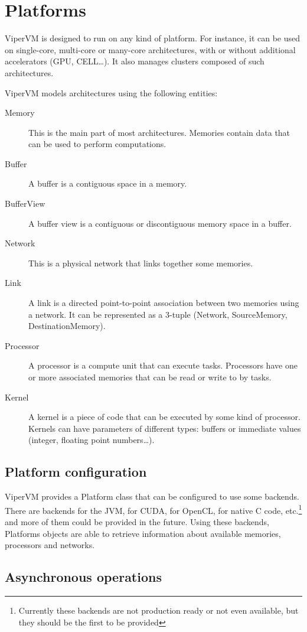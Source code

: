 \chapter{Platforms}

ViperVM is designed to run on any kind of platform. For instance, it can be
used on single-core, multi-core or many-core architectures, with or without
additional accelerators (GPU, CELL\ldots). It also manages clusters composed of
such architectures.

ViperVM models architectures using the following entities:

\begin{description}

  \item[Memory] This is the main part of most architectures. Memories contain
  data that can be used to perform computations.

  \item[Buffer] A buffer is a contiguous space in a memory.

  \item[BufferView] A buffer view is a contiguous or discontiguous memory space
  in a buffer.

  \item[Network] This is a physical network that links together some memories.

  \item[Link] A link is a directed point-to-point association between two
  memories using a network. It can be represented as a 3-tuple (Network,
  SourceMemory, DestinationMemory).

  \item[Processor] A processor is a compute unit that can execute tasks.
  Processors have one or more associated memories that can be read or write to
  by tasks.

  \item[Kernel] A kernel is a piece of code that can be executed by some kind of
  processor. Kernels can have parameters of different types: buffers or immediate
  values (integer, floating point numbers\ldots).

\end{description}

\section{Platform configuration}
ViperVM provides a Platform class that can be configured to use some backends.
There are backends for the JVM, for CUDA, for OpenCL, for native C code,
etc.\footnote{Currently these backends are not production ready or not even
available, but they should be the first to be provided} and more of them could
be provided in the future. Using these backends, Platforms objects are able to
retrieve information about available memories, processors and networks.

\section{Asynchronous operations}

